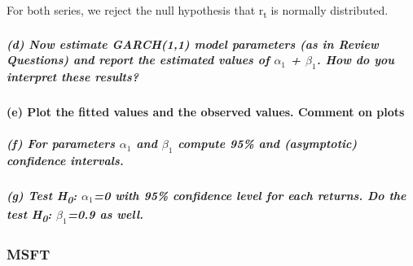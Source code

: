 \documentclass[]{article}
\let\oldparagraph\paragraph
\renewcommand{\paragraph}[1]{\oldparagraph{#1}\mbox{}}
\let\oldsubparagraph\subparagraph
\renewcommand{\subparagraph}[1]{\oldsubparagraph{#1}\mbox{}}
\begin{document}
For both series, we reject the null hypothesis that r\textsubscript{t}
is normally distributed.

\subparagraph{\texorpdfstring{(d) Now estimate GARCH(1,1) model
parameters (as in Review Questions) and report the estimated values of
\(\alpha_1\) + \(\beta_1\). How do you interpret these
results?}{(d) Now estimate GARCH(1,1) model parameters (as in Review Questions) and report the estimated values of \textbackslash{}alpha\_1 + \textbackslash{}beta\_1. How do you interpret these results?}}\label{d-now-estimate-garch11-model-parameters-as-in-review-questions-and-report-the-estimated-values-of-alpha_1-beta_1.-how-do-you-interpret-these-results}

\paragraph{(e) Plot the fitted values and the observed values. Comment
on
plots}\label{e-plot-the-fitted-values-and-the-observed-values.-comment-on-plots}

\subparagraph{\texorpdfstring{(f) For parameters \(\alpha_1\) and
\(\beta_1\) compute 95\% and (asymptotic) confidence
intervals.}{(f) For parameters \textbackslash{}alpha\_1 and \textbackslash{}beta\_1 compute 95\% and (asymptotic) confidence intervals.}}\label{f-for-parameters-alpha_1-and-beta_1-compute-95-and-asymptotic-confidence-intervals.}

\subparagraph{\texorpdfstring{(g) Test H\textsubscript{0}:
\(\alpha_1\)=0 with 95\% confidence level for each returns. Do the test
H\textsubscript{0}: \(\beta_1\)=0.9 as
well.}{(g) Test H0: \textbackslash{}alpha\_1=0 with 95\% confidence level for each returns. Do the test H0: \textbackslash{}beta\_1=0.9 as well.}}\label{g-test-h0-alpha_10-with-95-confidence-level-for-each-returns.-do-the-test-h0-beta_10.9-as-well.}

\subsubsection{MSFT}\label{msft}
\end{document}
